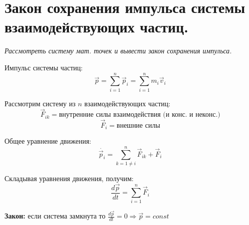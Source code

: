 \documentclass{article}
\begin{document}
   \section{Закон сохранения импульса системы взаимодействующих частиц.}
    \par
      \textit{Рассмотреть систему мат. точек и вывести закон сохранения импульса.}\\
    \par
      Импульс системы частиц:
      \begin{equation}
	\vec p = \sum_{i=1}^n\vec p_i=\sum_{i=1}^n m_i\vec v_i
      \end{equation}
    \par
      Рассмотрим систему из $n$ взаимодействующих частиц:
      \begin{equation}
	\vec F_{ik} = \text{внутренние силы взаимодействия (и конс. и неконс.)}
      \end{equation}
      \begin{equation}
	\vec F_{i} = \text{внешние силы}
      \end{equation}
    \par
      Общее уравнение движения:
      \begin{equation}
	\dot{\vec p_i}=\sum_{k=1\neq i}^n\vec F_{ik}+\vec F_i
      \end{equation}
    \par
      Складывая уравнения движения, получим:
      \begin{equation}
	\frac{d\vec p}{dt}=\sum_{i=1}^n \vec F_i
      \end{equation}
    \par
      \textbf{Закон:} если система замкнута то $\frac{d\vec p}{dt}=0\Rightarrow \vec p=const$
  \clearpage
  
\end{document}
